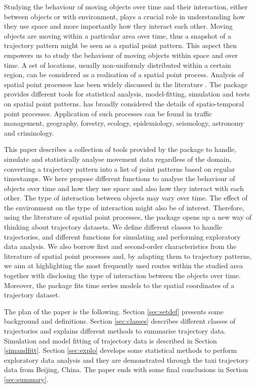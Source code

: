 \documentclass[article]{jss}
\begin{document}
Studying the behaviour of moving objects over time and their interaction, either between objects or with environment, plays a crucial role in understanding how they use space and more importantly how they interact each other. Moving objects are moving within a particular area over time, thus a snapshot of a trajectory pattern might be seen as a spatial point pattern. This aspect then empowers us to study the behaviour of moving objects within space and over time. A set of locations, usually non-uniformly distributed within a certain region, can be considered as a realisation of a spatial point process. Analysis of spatial point processes has been widely discussed in the literature \citep{MW03,IPSS08,D13,BRT15}. The  package  \citep{baddeley05,BRT15} provides different tools for statistical analysis, model-fitting, simulation and tests on spatial point patterns. \cite{D13} has broadly considered the details of spatio-temporal point processes. Application of such processes can be found in traffic management, geography, forestry, ecology, epidemiology, seismology, astronomy and criminology. 

This paper describes a collection of tools provided by the  package  to handle, simulate and statistically analyse movement data regardless of the domain, converting a trajectory pattern into a list of point patterns based on regular timestamps. We here propose different functions to analyse the behaviour of objects over time and how they use space and also how they interact with each other. The type of interaction between objects may vary over time. The effect of the environment on the type of interaction might also be of interest. Therefore, using the literature of spatial point processes, the  package  opens up a new way of thinking about trajectory datasets. We define different classes to handle trajectories, and different functions for simulating and performing exploratory data analysis. We also borrow first and second-order characteristics from the literature of spatial point processes and, by adapting them to trajectory patterns, we aim at highlighting the most frequently used routes within the studied area together with disclosing the type of interaction between the objects over time. Moreover, the  package fits time series models to the spatial coordinates of a trajectory dataset.

The plan of the paper is the following.
Section \ref{sec:setdef} presents some background and definitions.
Section \ref{sec:classes} describes different classes of trajectories and explains different methods to summarise trajectory data. Simulation and model fitting of trajectory data is described in Section \ref{simandfitt}. Section \ref{sec:explo} develops some statistical methods to perform exploratory data analysis and they are demonstrated through the taxi trajectory data from Beijing, China. The paper ends with some final conclusions in Section \ref{sec:summary}.
\end{document}
